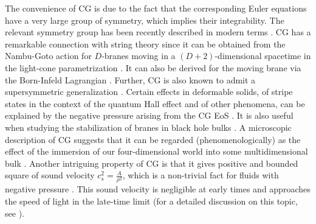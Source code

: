\documentclass[two-column, nofootinbib]{revtex4-1}
\begin{document}
The convenience of CG is due to the fact that the corresponding Euler equations have a very large group of symmetry, which implies their integrability. The relevant symmetry group has been recently described in modern terms \cite{Bazeia1}. CG has a remarkable connection with string theory since it can be obtained from the Nambu-Goto action for $D$-branes moving in a $(D+2)$-dimensional spacetime in the light-cone parametrization \cite{Bordemann1}. It can also be derived for the moving brane via the Born-Infeld Lagrangian \cite{Bento1}. Further, CG is also known to admit a supersymmetric generalization \cite{Hoppe1,Jackiw1}. Certain effects in deformable solids, of stripe states in the context of the quantum Hall effect and of other phenomena, can be explained by the negative pressure arising from the CG EoS \cite{Stanyukovich1}. It is also useful when studying the stabilization of branes in black hole bulks \cite{Kamenshchik2,Randall1,Banados1}. A microscopic description of CG suggests that it can be regarded (phenomenologically) as the effect of the immersion of our four-dimensional world into some multidimensional bulk \cite{Bilic1,Sundrum1}. Another intriguing property of CG is that it gives positive and bounded square of sound velocity $c_{s}^{2}=\frac{A}{\rho ^2}$, which is a non-trivial fact for fluids with negative pressure \cite{Kamenshchik1,Gorini1}. This sound velocity is negligible at early times and approaches the speed of light in the late-time limit (for a detailed discussion on this topic, see \cite{Zimdahl1}).
\end{document}
